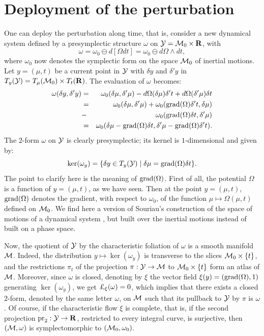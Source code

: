 \section{Deployment of the perturbation}

One can deploy the perturbation along time, that is, consider a new dynamical system
defined by a presymplectic structure $\omega$ on $\mathcal{Y} = \mathcal{M}_0 \times \mathbf{R}$, with
$$
  \omega = \omega_0 \ominus d[\Omega dt] = \omega_0 \ominus d\Omega \wedge dt,
$$
where $\omega_0$ now denotes the symplectic form on the space $\mathcal{M}_0$ of inertial motions.
Let $y = (\mu,t)$ be a current point in $\mathcal{Y}$ with $\delta y$ and $\delta'y$ in
$T_y(\mathcal{Y}) = T_\mu(\mathcal{M}_0) \times T_t(\mathbf{R})$. The evaluation of $\omega$ becomes:
\begin{eqnarray*}
  \omega(\delta y, \delta'y) & = & \omega_0(\delta \mu,\delta'\mu) -
  d\Omega(\delta \mu) \delta't + d\Omega(\delta'\mu)\delta t \\
  & = & \omega_0(\delta \mu,\delta'\mu) + \omega_0(\operatorname{grad}(\Omega)\delta't,\delta \mu)\\
  & - & \omega_0(\operatorname{grad}(\Omega)\delta t,\delta'\mu) \\
  & = & \omega_0(\delta \mu - \operatorname{grad}(\Omega)\delta t, \delta' \mu - \operatorname{grad}(\Omega)\delta' t).
\end{eqnarray*}
The $2$-form $\omega$ on $\mathcal{Y}$ is clearly presymplectic;
its kernel is
$1$-dimensional and given by:
$$
  \mathrm{ker}(\omega_y)= \{\delta y \in T_y(\mathcal{Y}) \mid \delta \mu = \operatorname{grad}(\Omega)\delta t\}.
$$
The point to clarify here is the meaning of $\operatorname{grad}(\Omega)$. First of all,
the potential $\Omega$
is a function of $y = (\mu,t)$, as we have seen. Then at the point $y = (\mu,t)$,
$\operatorname{grad}(\Omega)$ denotes the gradient, with respect to $\omega_0$, of the
function $\mu \mapsto \Omega(\mu,t)$ defined on $\mathcal{M}_0$. We find here
a version of Souriau's construction of the space of motions of a dynamical system
\cite{Sou70}, but built over the inertial motions instead of built on a phase space.

Now, the quotient of $\mathcal{Y}$ by the characteristic foliation of $\omega$ is a smooth manifold
$\mathcal{M}$. Indeed, the distribution $y \mapsto \ker(\omega_y)$ is transverse to the
slices $\mathcal{M}_0 \times \{t\}$, and the restrictions $\pi_t$ of the projection $\pi : \mathcal{Y} \to \mathcal{M}$ to
$\mathcal{M}_0 \times \{t\}$ form an atlas of $\mathcal{M}$. Moreover, since $\omega$ is closed,
denoting by $\xi$ the vector field
$\xi(y) = (\operatorname{grad}(\Omega),1)$ generating $\ker(\omega_y)$, we get
$\DLie_\xi(\omega) = 0$, which implies that there exists a closed $2$-form,
denoted by the same letter
$\omega$, on $\mathcal{M}$ such that its pullback to $\mathcal{Y}$ by $\pi$ is $\omega$. Of course,
if the characteristic flow $\xi$ is complete, that is, if the second projection
$\operatorname{pr}_2 : \mathcal{Y} \to \mathbf{R}$, restricted to every integral curve, is surjective, then
$(\mathcal{M},\omega)$ is symplectomorphic to $(\mathcal{M}_0,\omega_0)$.

